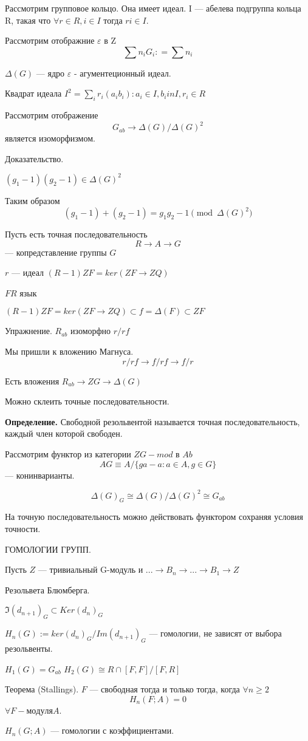 \documentclass[
 aps, pra,
 amsmath,amssymb,
 11pt,
 final,
tightenlines,
 twoside,
 twocolumn,
 nofloats,
nofootinbib,
 superscriptaddress,
showkeys,
showkeywords,
 ]
{revtex4-2}
\begin{document}
{Рассмотрим групповое кольцо. Она имеет идеал. I --- абелева подгруппа кольца R, такая что $\forall r \in R, i \in I$ тогда $ri \in I.$


Рассмотрим отображние $\varepsilon$ в Z
$$\sum n_iG_i : = \sum n_i$$

$\Delta(G)$ --- ядро $\varepsilon$ - агументеционный идеал. 

Квадрат идеала $I^2 = {\sum_i r_i(a_ib_i) : a_i \in I, b_i in I, r_i \in R}$

Рассмотрим отображение 
$$
G_{ab} \to \Delta(G) / \Delta(G)^2
$$
является изоморфизмом.

Доказательство. 

$(g_1-1)(g_2-1) \in \Delta(G)^2$ 

Таким образом
$$
(g_1-1)+(g_2-1) = g_1g_2-1 \pmod {\Delta(G)^2}
$$

\hrulefill

Пусть есть точная последовательность  
$$
R \to A \to G 
$$
--- копредставление группы $G$

$r$ --- идеал $(R-1)ZF = ker (ZF \to ZQ)$

$FR$ язык

$ (R-1)ZF = ker (ZF \to ZQ) \subset f = \Delta(F) \subset ZF$

Упражнение. $R_{ab}$ изоморфно $r/rf$


Мы пришли к вложению Магнуса. 
$$
r/rf \to f/rf \to f/r
$$

Есть вложения $R_{ab} \to ZG \to \Delta(G)$

Можно склеить точные последовательности.

{ \bf Определение. } Свободной резольвентой называется точная последовательность, каждый член которой свободен.

Рассмотрим функтор из категории $ZG-mod$ в $Ab$
$$
AG \equiv A/\{ga-a:a\in A, g\in G\}
$$
--- конинварианты.

$$\Delta(G)_G \cong \Delta(G)/\Delta(G)^2 \cong G_{ab}$$

На точную последовательность можно действовать функтором сохраняя условия точности.

\hrulefill

ГОМОЛОГИИ ГРУПП.

Пусть $Z$ --- тривиальный G-модуль и $... \to B_n \to ... \to B_1 \to Z$

Резольвета Блюмберга.

$\Im (d_{n+1})_G \subset Ker (d_n)_G$


$H_n(G) := ker(d_n)_G / Im (d_{n+1})_G$
--- гомологии, не зависят от выбора резольвенты.

$H_1(G) = G_{ab}$
$H_2(G) \cong R \cap [F, F] / [F, R]$ 


Теорема (Stallings). $F$ --- свободная тогда и только тогда, когда $\forall n \geq 2$ 
$$
H_n(F; A) = 0
$$
$\forall F-модуля A$.

$H_n(G; A)$ --- гомологии с коэффициентами.

}
\end{document}
